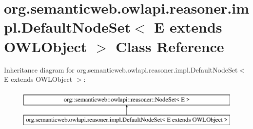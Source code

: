 \hypertarget{classorg_1_1semanticweb_1_1owlapi_1_1reasoner_1_1impl_1_1_default_node_set_3_01_e_01extends_01_o_w_l_object_01_4}{\section{org.\-semanticweb.\-owlapi.\-reasoner.\-impl.\-Default\-Node\-Set$<$ E extends O\-W\-L\-Object $>$ Class Reference}
\label{classorg_1_1semanticweb_1_1owlapi_1_1reasoner_1_1impl_1_1_default_node_set_3_01_e_01extends_01_o_w_l_object_01_4}
}
Inheritance diagram for org.\-semanticweb.\-owlapi.\-reasoner.\-impl.\-Default\-Node\-Set$<$ E extends O\-W\-L\-Object $>$\-:\begin{figure}[H]
\begin{center}
\leavevmode
\includegraphics[height=2.000000cm]{classorg_1_1semanticweb_1_1owlapi_1_1reasoner_1_1impl_1_1_default_node_set_3_01_e_01extends_01_o_w_l_object_01_4}
\end{center}
\end{figure}

